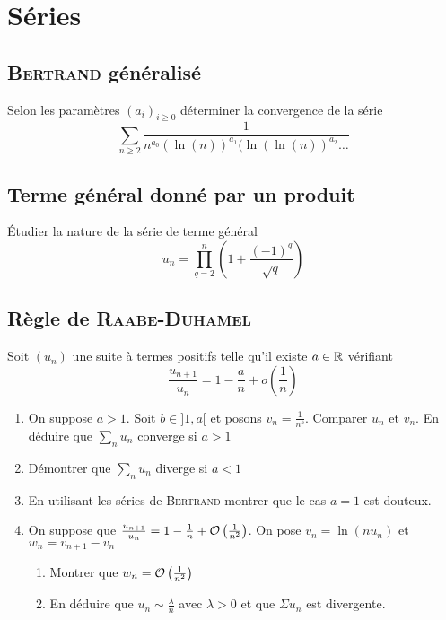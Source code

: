 \section{Séries}

\subsection{\textsc{Bertrand} généralisé}

Selon les paramètres $(a_i)_{i\geqslant 0}$ déterminer la convergence de la série
\[
    \sum_{n\geqslant 2} \frac{1}{n^{a_0} (\ln(n))^{a_1} (\ln(\ln(n))^{a_2} \ldots }
\]

\subsection{Terme général donné par un produit}
Étudier la nature de la série de terme général
\[
    u_n=\prod_{q=2}^n\left(1+\frac{(-1)^q}{\sqrt{q}}\right)
\]

\subsection{Règle de \textsc{Raabe}-\textsc{Duhamel}}

Soit $(u_n)$ une suite à termes positifs telle qu'il existe $a\in \mathbb{R}$ vérifiant
\[
    \frac{u_{n+1}}{u_n}=1-\frac{a}{n}+o\left(\frac{1}{n}\right)
\]

\begin{enumerate}
    \item On suppose $a>1$. Soit $b\in ]1,a[$ et posons $v_n = \frac{1}{n^b}$. Comparer $u_n$ et $v_n$. En déduire que $\sum\limits_n u_n$ converge si $a>1$
    \item Démontrer que $\sum\limits_n u_n$ diverge si $a<1$
    \item En utilisant les séries de \textsc{Bertrand} montrer que le cas $a=1$ est douteux.
    \item On suppose que $\frac{u_{n+1}}{u_n}=1-\frac{1}{n}+\mathcal{O}\left(\frac{1}{n^2}\right)$. On pose $v_n = \ln(n u_n)$ et $w_n=v_{n+1} - v_n$
    \begin{enumerate}
        \item Montrer que $w_n=\mathcal{O}\left(\frac{1}{n^2}\right)$
        \item En déduire que $u_n \sim \frac{\lambda}{n}$ avec $\lambda>0$ et que $\Sigma u_n$ est divergente.
    \end{enumerate}
\end{enumerate}

